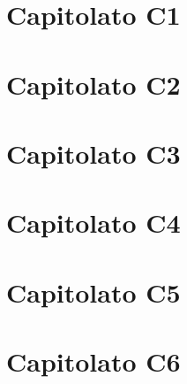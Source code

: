 \documentclass[a4paper, 12pt]{article}
\begin{document}
            \section{Capitolato C1}
                
                \newpage
            \section{Capitolato C2}
                
                \newpage
            \section{Capitolato C3}
                
                \newpage
            \section{Capitolato C4}
                
                \newpage
            \section{Capitolato C5}
                
                \newpage
            \section{Capitolato C6}
                
            
\end{document}
